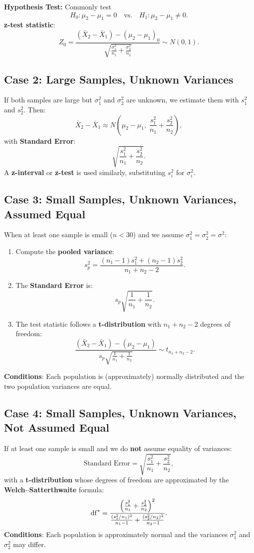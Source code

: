 \documentclass[10pt]{extarticle}
\begin{document}
\textbf{Hypothesis Test:} Commonly test 
\[
H_0 : \mu_2 - \mu_1 = 0 \quad \text{vs.} \quad H_1 : \mu_2 - \mu_1 \neq 0.
\]
\textbf{z-test statistic}:
\[
Z_0 = \frac{(\bar{X}_2 - \bar{X}_1) - (\mu_2 - \mu_1)_0}{\sqrt{\frac{\sigma_1^2}{n_1} + \frac{\sigma_2^2}{n_2}}} \sim N(0,1).
\]

\subsection{Case 2: Large Samples, Unknown Variances}
If both samples are large but $\sigma_1^2$ and $\sigma_2^2$ are unknown, we estimate them with $s_1^2$ and $s_2^2$. Then:
\[
\bar{X}_2 - \bar{X}_1 \approx N\!\left(\mu_2 - \mu_1, \; \frac{s_1^2}{n_1} + \frac{s_2^2}{n_2}\right),
\]
with \textbf{Standard Error}:
\[
\sqrt{\frac{s_1^2}{n_1} + \frac{s_2^2}{n_2}}.
\]
A \textbf{z-interval} or \textbf{z-test} is used similarly, substituting $s_i^2$ for $\sigma_i^2$.

\subsection{Case 3: Small Samples, Unknown Variances, Assumed Equal}
When at least one sample is small ($n < 30$) and we assume $\sigma_1^2 = \sigma_2^2 = \sigma^2$:
\begin{enumerate}
    \item Compute the \textbf{pooled variance}:
    \[
    s_p^2 = \frac{(n_1 - 1)s_1^2 + (n_2 - 1)s_2^2}{n_1 + n_2 - 2}.
    \]
    \item The \textbf{Standard Error} is:
    \[
    s_p \sqrt{\frac{1}{n_1} + \frac{1}{n_2}}.
    \]
    \item The test statistic follows a \textbf{t-distribution} with $n_1 + n_2 - 2$ degrees of freedom:
    \[
    \frac{(\bar{X}_2 - \bar{X}_1) - (\mu_2 - \mu_1)}{s_p \sqrt{\frac{1}{n_1} + \frac{1}{n_2}}} \sim t_{n_1 + n_2 - 2}.
    \]
\end{enumerate}
\textbf{Conditions}: Each population is (approximately) normally distributed and the two population variances are equal.

\subsection{Case 4: Small Samples, Unknown Variances, Not Assumed Equal}
If at least one sample is small and we do \textbf{not} assume equality of variances:
\[
\text{Standard Error} = \sqrt{\frac{s_1^2}{n_1} + \frac{s_2^2}{n_2}},
\]
with a \textbf{t-distribution} whose degrees of freedom are approximated by the \textbf{Welch–Satterthwaite} formula:
\[
\mathrm{df}^* = \frac{\Bigl(\frac{s_1^2}{n_1} + \frac{s_2^2}{n_2}\Bigr)^2}{\frac{(s_1^2/n_1)^2}{n_1 - 1} + \frac{(s_2^2/n_2)^2}{n_2 - 1}}.
\]
\textbf{Conditions}: Each population is approximately normal and the variances $\sigma_1^2$ and $\sigma_2^2$ may differ.
\end{document}
